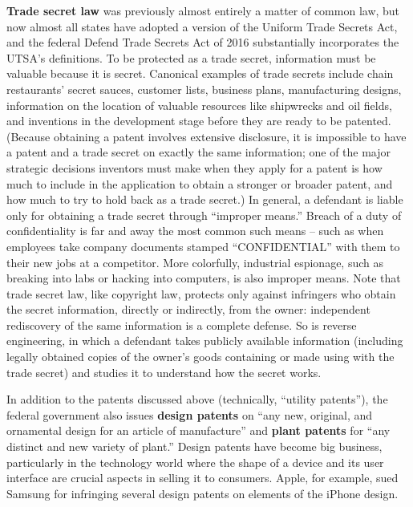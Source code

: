\textbf{Trade secret law} was previously almost entirely
a matter of common law, but now almost all states have adopted a version of the
Uniform Trade Secrets Act, and the federal Defend Trade Secrets Act of 2016
substantially incorporates the UTSA's definitions. To be protected as
a trade secret, information must be valuable because it is secret. Canonical
examples of trade secrets include chain restaurants' secret sauces, customer
lists, business plans, manufacturing designs, information on the location of
valuable resources like shipwrecks and oil fields, and inventions in the
development stage before they are ready to be patented. (Because obtaining a
patent involves extensive disclosure, it is impossible to have a patent and a
trade secret on exactly the same information; one of the major strategic
decisions inventors must make when they apply for a patent is how much to
include in the application to obtain a stronger or broader patent, and how much
to try to hold back as a trade secret.) In general, a defendant is liable only
for obtaining a trade secret through ``improper means.'' Breach of a duty of
confidentiality is far and away the most common such means -- such as when
employees take company documents stamped ``CONFIDENTIAL'' with them to their
new jobs at a competitor. More colorfully, industrial espionage, such as
breaking into labs or hacking into computers, is also improper means. Note that
trade secret law, like copyright law, protects only against infringers who
obtain the secret information, directly or indirectly, from the owner:
independent rediscovery of the same information is a complete defense. So is
reverse engineering, in which a defendant takes publicly available information
(including legally obtained copies of the owner's goods containing or made
using with the trade secret) and studies it to understand how the secret works.


In addition to the patents discussed above (technically, ``utility
patents''), the federal government also issues \textbf{design patents} on ``any
new, original, and ornamental design for an article of
manufacture'' and \textbf{plant patents} for ``any distinct
and new variety of plant.'' Design patents have become big business,
particularly in the technology world where the shape of a device and its user
interface are crucial aspects in selling it to consumers. Apple, for example,
sued Samsung for infringing several design patents on elements of the
iPhone design.

